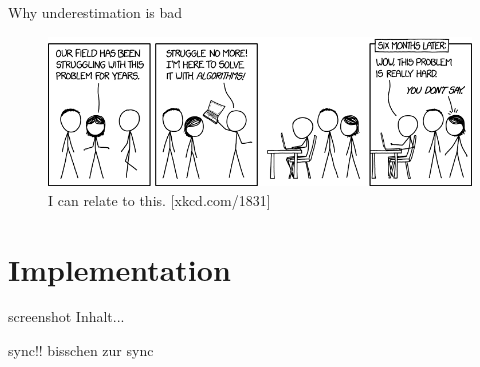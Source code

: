 \documentclass[xcolor=x11names, aspectratio=169,usenames,dvipsnames]{beamer}
\begin{document}
\begin{frame}{Why underestimation is bad}
\begin{center}
\begin{figure}
	\includegraphics[width=\textwidth]{img/xkcd.png}
	\caption{I can relate to this. [xkcd.com/1831]}
\end{figure}
\end{center}
\end{frame}

\section{Implementation}

\begin{frame}{screenshot}
Inhalt...
\end{frame}

\begin{frame}{sync!!}
bisschen zur sync
\end{frame}
\end{document}
